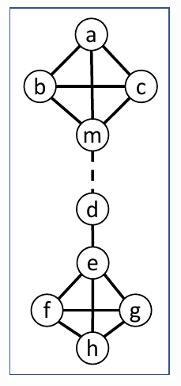 \documentclass{article}
\begin{document}
\begin{figure}[t]
    \centering
        \begin{subfigure}{0.09\textwidth}
            \centering
            \includegraphics[page=2,width=\textwidth]{Graphs/Distance_1_paper.pdf}

\end{subfigure}
\end{figure}
\end{document}
